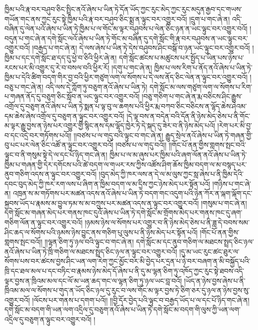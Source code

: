 ཁྱིམ་པའི་རྣ་བར་བཤུབ་ཅིང་སྤྲིང་ནའོ་ཞེས་པ་ཡིན་ཏེ་དོན་ཡོད་ཀྱང་རུང་མེད་ཀྱང་རུང་མདུན་རྒྱབ་དང་གཡས་གཡོན་གང་ནས་ཀྱང་རུང་སྟེ་ཁྱིམ་པའི་རྣ་བར་བཤུབ་ཅིང་སྨྲ་ན་ལྟུང་བར་འགྱུར་བའོ། །དྲུག་པ་གང་ཞེ་ན། འདི་བཞིན་དུ་ལེན་པའོ་ཞེས་པ་ཡིན་ཏེ་ཁྱིམ་པ་ལ་གོང་མ་ལྟར་བཤུབས་པ་ལེན་ཅིང་ཉན་ན་ཡང་ལྟུང་བར་འགྱུར་བའོ། །བདུན་པ་གང་ཞེ་ན་དགེ་སློང་ལའོ་ཞེས་པ་ཡིན་ཏེ་གོང་མ་བཞིན་དུ་དགེ་སློང་གི་རྣ་བར་བཤུབས་ན་ཡང་ལྟུང་བར་འགྱུར་བའོ། །བརྒྱད་པ་གང་ཞེ་ན། དེ་ལས་ཞེས་པ་ཡིན་ཏེ་དེས་བཤུབས་ཤིང་བསྒོ་བ་ཉན་ཡང་ལྟུང་བར་འགྱུར་བའོ། །ཁྱིམ་པ་དང་དགེ་སློང་ཐ་དད་དུ་ཕྱེ་བ་ཅིའི་ཕྱིར་ཞེ་ན། དགེ་སློང་ཚངས་པ་མཚུངས་པར་སྤྱོད་པ་ཡིན་པས་ཉེས་པ་རངས་པར་མི་འགྱུར་དུ་རེ་བ་བསལ་བའི་ཕྱིར་རོ། །དགུ་པ་གང་ཞེ་ན། ཁྱིམ་པ་ལས་རིག་པ་ནོད་ནའོ་ཞེས་པ་ཡིན་ཏེ་ཁྱིམ་པ་དེའི་ཚིག་བདག་གིར་བྱ་བའི་ཕྱིར་གཙུག་ལག་ལ་སོགས་པ་དེ་ལས་ནོད་ཅིང་ལེན་ན་ལྟུང་བར་འགྱུར་བའོ། །བཅུ་པ་གང་ཞེ་ན། འདི་ལས་དེ་ཀློག་ཏུ་བཅུག་ནའོ་ཞེས་པ་ཡིན་ཏེ། དགེ་སློང་མ་ལས་གཙུག་ལག་ལ་སོགས་པ་རིག་པ་གཞན་ནོད་དུ་བཅུག་ཅིང་སློབ་ན་ཡང་ལྟུང་བར་འགྱུར་བའོ། །བཅུ་གཅིག་པ་གང་ཞེ་ན་རྨ་བཅིངས་ཤིང་རྒྱུས་འགྲོལ་དུ་བཅུག་ནའོ་ཞེས་པ་ཡིན་ཏེ་སྨན་པ་ལྟ་བུ་ལ་ཆགས་པའི་ཕྱིར་རྨ་བཀབ་ཅིང་བཅིངས་ན་ལྷོད་ཆེས་ཤེའམ་དམ་ཆེས་ཞེས་འགྲོལ་དུ་བཅུག་ན་ལྟུང་བར་འགྱུར་བའོ། །དེ་ལྟ་བས་ན་བདེན་བའི་དོན་ནི་ཉེས་མེད་ཅེས་པ་ནི་གོང་མ་ལྟར་རྒྱུ་བྱས་ན་ཉེས་པར་འགྱུར་གྱི་སྙིང་ནས་དམ་ལྷོད་ཁྱེར་ཏེ་དེ་སྐད་དུ་ཟེར་བ་ནི་ཉེས་མེད་པའོ། །རེག་པར་མི་བྱ་བ་དང་འདྲེ་བར་གཏོགས་པའོ།། །།བཙས་པ་ལ་གདུ་བའི་ལྟུང་བ་གང་ཞེ་ན། རྒྱུད་སྲེལ་ནའོ་ཞེས་པ་ཡིན་ཏེ་གཞན་གྱི་བུ་པང་པར་ལེན་ཅིང་འཚོ་ན་ལྟུང་བར་འགྱུར་བའོ། །བཙས་པ་ལ་གདུ་བའོ།། །།གོང་པོ་ནན་གྱིས་གླགས་སྤང་བའི་ལྟུང་བ་ནི་གསུམ་སྟེ་དེ་ལ་དང་པོ་ཉིད་གང་ཞེ་ན། ཁྱིམ་པ་ལ་མ་ཞུས་པར་ཁྱིམ་པའི་ཞག་ལོན་ནའོ་ཞེས་པ་ཡིན་ཏེ་ཁྱིམ་པ་གཞན་གྱི་དེར་དགོངས་པའི་ཚེ་བདག་ལ་གཡར་རས་ཀྱིས་འཚོས་ཤིག་ཆོས་ཁྱིམ་བདག་ལ་མ་བསྙད་པར་ནུབ་གཅིག་འདས་ན་ལྟུང་བར་འགྱུར་བའོ། །བུད་མེད་ཀྱི་ཁར་ལས་ན་དེ་ལ་མ་ལུས་ཀྱང་སླ་ཞེས་པ་ནི་ཁྱིམ་དེའི་དབང་བུད་མེད་ཀྱི་ཁར་རག་ལས་པ་ཞིག་ན་ཁྱིམ་བདག་ལ་མ་དྲིས་ཀྱང་ཉེས་མེད་པར་སྟོན་པའོ། །གཉིས་པ་གང་ཞེ་ན། འཁྲན་ས་མ་གཏོགས་པར་མཚན་འདས་ནའོ་ཞེས་པ་ཡིན་ཏེ་བདག་གང་འདུག་པའི་ཉེན་ཀོར་ན་ལྐག་ལྐོག་དང་སྐྱབས་ཡོད་པ་རྣམས་མ་བྱུལ་ཏམ་ས་མ་བཀྲུས་པར་མཚན་འདས་ན་ལྟུང་བར་འགྱུར་བའོ། །གསུམ་པ་གང་ཞེ་ན། དགེ་སློང་མ་གཞན་མེད་པར་གནས་ཁང་དུའོ་ཞེས་པ་ཡིན་ཏེ་དགེ་སློང་མ་གྲོགས་མེད་པར་གནས་ཁང་དུ་ཞག་གཅིག་ལོན་ན་ལྟུང་བར་འགྱུར་བའོ། །ཉམས་ཉེས་ལ་སོགས་པར་འགྱུར་བ་ནི་ཉེས་མེད་ཅེས་པ་ནི་ཟླ་དེ་བབས་སམ་ཤིང་ཆད་ལ་སོགས་པའི་ཉམས་ཉེས་བྱུང་ནས་གཅིག་པུ་ལུས་པ་ནི་ཉེས་མེད་པར་སྟོན་པའོ། །གོང་པོ་ནན་གྱིས་གླགས་སྤང་བའོ།། །།ལྷན་ཅིག་ཏུ་ཉལ་བའི་ལྟུང་བ་གང་ཞེ་ན། དགེ་སློང་མ་དང་ནུབ་གཅིག་ལ་མཐངས་སྤྲད་ཅིང་ཉལ་ནའོ་ཞེས་པ་ཡིན་ཏེ་ཁྲི་གཅིག་ལ་མཐངས་སྤྲད་ཅིང་ཉལ་ན་ལྟུང་བར་འགྱུར་བའོ། །དུ་མ་ཡང་རུང་ཚང་ཐུར་ལ་སོགས་པས་བར་ཚངས་བྱས་ཤིང་ཡན་ལག་རེག་ཀྱང་མྱོང་བར་མི་བྱེད་པར་དྲན་པ་ཉེ་བར་བཞག་ན་མི་བསྐྱོད་པའི་ཁྲི་དང་ཐལ་མལ་པ་དང་བཏིང་བ་རྣམས་ཉེས་མེད་དོ་ཞེས་པ་ནི་དུ་མ་ལྷན་ཅིག་ཏུ་འཁོད་ཀྱང་རུང་སྟེ་ཐབས་འདི་ལྟར་བྱས་ན་ཁྲིའམ་མལ་དང་ལོ་མ་ཡན་ཆད་གང་ལ་ལྷན་ཅིག་ཏུ་ཉལ་ཡང་བླ་བའོ། །ཡོད་ན་ཉེས་བྱས་ཞེས་པ་ནི་ཁྲིའམ་མལ་ལ་སོགས་པ་གུད་ན་ཡོད་ཅིང་ཉལ་དུ་རུང་བ་ལས་གོང་མ་ལྟར་བྱས་ཏེ་ཅིག་ཅར་དུ་ཉལ་ན་ཉེས་བྱས་སུ་འགྱུར་བའོ། །ལོངས་པར་གནས་པ་དགག་པའོ།། །།བྱི་དོར་བྱེད་པའི་ལྟུང་བ་བརྒྱད་ཡོད་པ་ལ་དང་པོ་ཉིད་གང་ཞེ་ན། དགེ་སློང་མ་བདག་གི་ཡན་ལག་འདྲིལ་དུ་བཅུག་ནའོ་ཞེས་པ་ཡིན་ཏེ་དགེ་སློང་མ་བདག་གི་ལུས་ཀྱི་ཡན་ལག་འདྲིལ་དུ་བཅུག་ན་ལྟུང་བར་འགྱུར་བའོ། །

